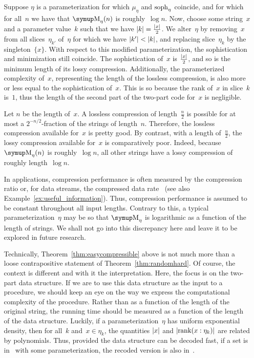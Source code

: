 \begin{example}
  Suppose $\eta$ is a parameterization for which $\mu_\eta$ and $\operatorname{soph}_\eta$ coincide, and for which for all~$n$ we have that $\upM_\eta(n)$ is roughly~$\log n$.
  Now, choose some string~$x$ and a parameter value~$k$ such that we have ${\lvert k\rvert} = \frac{{\lvert x\rvert}}{2}$.
  We alter~$\eta$ by removing~$x$ from all slices~$\eta_{k'}$ of~$\eta$ for which we have ${\lvert k'\rvert} < {\lvert k\rvert}$, and replacing slice~$\eta_k$ by the singleton~$\{x\}$.
  With respect to this modified parameterization, the sophistication and minimization still coincide.
  The sophistication of~$x$ is $\frac{{\lvert x\rvert}}{2}$, and so is the minimum length of its lossy compression.
  Additionally, the parameterized complexity of~$x$, representing the length of the lossless compression, is also more or less equal to the sophistication of~$x$.
  This is so because the rank of~$x$ in slice~$k$ is~$1$, thus the length of the second part of the two-part code for~$x$ is negligible.

  Let $n$ be the length of~$x$.
  A lossless compression of length~$\frac{n}{2}$ is possible for at most a $2^{-n/2}$-fraction of the strings of length~$n$.
  Therefore, the lossless compression available for~$x$ is pretty good.
  By contrast, with a length of~$\frac{n}{2}$, the lossy compression available for~$x$ is comparatively poor.
  Indeed, because $\upM_\eta(n)$ is roughly~$\log n$, all other strings have a lossy compression of roughly length~$\log n$.
\end{example}

\label{p:compression_ratio}%
In applications, compression performance is often measured by the compression ratio or, for data streams, the compressed data rate~\parencite{sayood2017introduction,sneyers2016flif} (see also Example~\ref{ex:useful_information}).
Thus, compression performance is assumed to be constant throughout all input lengths.
Contrary to this, a typical parameterization~$\eta$ may be so that $\upM_\eta$ is logarithmic as a function of the length of strings.
We shall not go into this discrepancy here and leave it to be explored in future research.

Technically, Theorem~\ref{thm:easycompressible} above is not much more than a loose contrapositive statement of Theorem~\ref{thm:randomhard}.
Of course, the context is different and with it the interpretation.
Here, the focus is on the two-part data structure.
If we are to use this data structure as the input to a procedure, we should keep an eye on the way we express the computational complexity of the procedure.
Rather than as a function of the length of the original string, the running time should be measured as a function of the length of the data structure.
Luckily, if a parameterization~$\eta$ has uniform exponential density, then for all~$k$ and~$x \in \eta_k$, the quantities ${\lvert x\rvert}$ and ${\lvert\operatorname{rank}(x : \eta_k)\rvert}$ are related by polynomials.
Thus, provided the data structure can be decoded fast, if a set is in~ with some parameterization, the recoded version is also in~.

